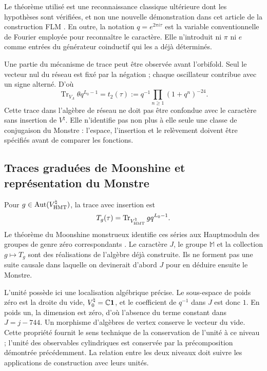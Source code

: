 Le théorème utilisé est une reconnaissance classique ultérieure dont les hypothèses sont vérifiées, et non une nouvelle démonstration dans cet article de la construction FLM \cite{flm}. En outre, la notation $q=e^{2\pi i\tau}$ est la variable conventionnelle de Fourier employée pour reconnaître le caractère. Elle n'introduit ni $\pi$ ni $e$ comme entrées du générateur coinductif qui les a déjà déterminés.

Une partie du mécanisme de trace peut être observée avant l'orbifold.
Seul le vecteur nul du réseau est fixé par la négation ; chaque
oscillateur contribue avec un signe alterné. D'où
\[
 \operatorname{Tr}_{V_\Lambda}\theta q^{L_0-1}
   =t_2(\tau)
   :=q^{-1}\prod_{n\geq1}(1+q^n)^{-24}.
\]
Cette trace dans l'algèbre de réseau ne doit pas être confondue avec le
caractère sans insertion de $V^\natural$. Elle n'identifie pas non plus à elle
seule une classe de conjugaison du Monstre : l'espace, l'insertion
et le relèvement doivent être spécifiés avant de comparer les fonctions.








\subsection{Traces graduées de Moonshine et représentation du Monstre}
\label{exc:alcance}

Pour $g\in\operatorname{Aut}(V^\natural_{\rm HMT})$, la trace avec insertion est
\[
 T_g(\tau)=
 \operatorname{Tr}_{V^\natural_{\rm HMT}}gq^{L_0-1}.
\]
Le théorème du Moonshine monstrueux identifie ces séries aux
Hauptmoduln des groupes de genre zéro correspondants
\cite[théorème~1.1]{borcherds}.
Le caractère $J$, le groupe $\mathbb M$ et la collection $g\mapsto T_g$
sont des réalisations de l'algèbre déjà construite. Ils ne forment pas une suite
causale dans laquelle on devinerait d'abord $J$ pour en déduire ensuite le Monstre.

L'unité possède ici une localisation algébrique précise. Le sous-espace de poids zéro est la droite du vide, \(V^\natural_0=\mathbb C\mathbf1\), et le coefficient de \(q^{-1}\) dans \(J\) est donc \(1\). En poids un, la dimension est zéro, d'où l'absence du terme constant dans \(J=j-744\). Un morphisme d'algèbres de vertex conserve le vecteur du vide. Cette propriété fournit le sens technique de la conservation de l'unité à ce niveau ; l'unité des observables cylindriques est conservée par la précomposition démontrée précédemment. La relation entre les deux niveaux doit suivre les applications de construction avec leurs unités.

